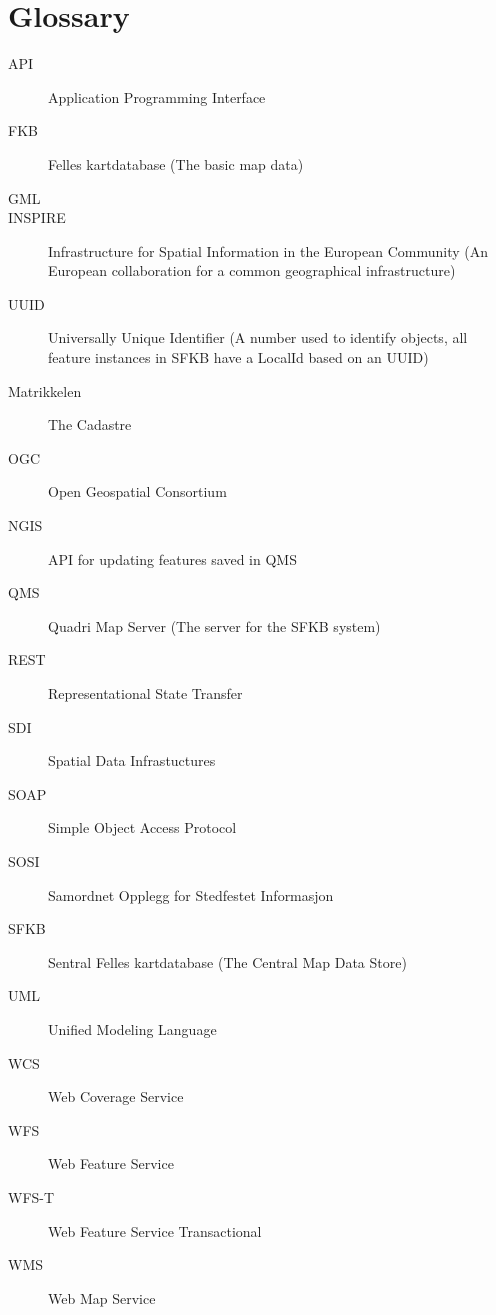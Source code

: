 
\chapter{Glossary}
\begin{description}
	\item[API] Application Programming Interface
	\item[FKB] Felles kartdatabase (The basic map data)
	\item[GML] 
	\item[INSPIRE] Infrastructure for Spatial Information in the European Community (An European collaboration for a common geographical infrastructure)
	\item[UUID] Universally Unique Identifier (A number used to identify objects, all feature instances in SFKB have a LocalId based on an UUID)
	\item[Matrikkelen] The Cadastre
	\item[OGC] Open Geospatial Consortium
	\item[NGIS] API for updating features saved in QMS
	\item[QMS] Quadri Map Server (The server for the SFKB system)
	\item[REST] Representational State Transfer 
	\item[SDI] Spatial Data Infrastuctures
	\item[SOAP] Simple Object Access Protocol
	\item[SOSI] Samordnet Opplegg for Stedfestet Informasjon
	\item[SFKB] Sentral Felles kartdatabase (The Central Map Data Store)
	\item[UML] Unified Modeling Language
	\item[WCS] Web Coverage Service
	\item[WFS] Web Feature Service
	\item[WFS-T] Web Feature Service Transactional
	\item[WMS] Web Map Service
\end{description}
